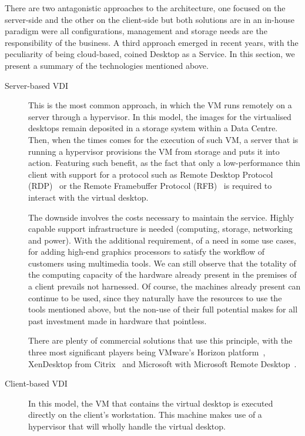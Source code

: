 There are two antagonistic approaches to the architecture, one focused on the server-side and the other on the client-side but both solutions are in an in-house paradigm were all configurations, management and storage needs are the responsibility of the business. A third approach emerged in recent years, with the peculiarity of being cloud-based, coined Desktop as a Service.
In this section, we present a summary of the technologies mentioned above.

\begin{description}
	\item [Server-based VDI] This is the most common approach, in which the VM runs remotely on a server through a hypervisor. In this model, the images for the virtualised desktops remain deposited in a storage system within a Data Centre. Then, when the times comes for the execution of such VM, a server that is running a hypervisor provisions the VM from storage and puts it into action. Featuring such benefit, as the fact that only a low-performance thin client with support for a protocol such as Remote Desktop Protocol (RDP)~\cite{Microsoft_RDP} or the Remote Framebuffer Protocol (RFB)~\cite{rfc6143} is required to interact with the virtual desktop.

        The downside involves the costs necessary to maintain the service. Highly capable support infrastructure is needed (computing, storage, networking and power). With the additional requirement, of a need in some use cases, for adding high-end graphics processors to satisfy the workflow of customers using multimedia tools. We can still observe that the totality of the computing capacity of the hardware already present in the premises of a client prevails not harnessed. Of course, the machines already present can continue to be used, since they naturally have the resources to use the tools mentioned above, but the non-use of their full potential makes for all past investment made in hardware that pointless.

        There are plenty of commercial solutions that use this principle, with the three most significant players being VMware's Horizon platform~\cite{VMware_horizon}, XenDesktop from Citrix~\cite{Citrix_XenDesktop} and Microsoft with Microsoft Remote Desktop~\cite{Microsoft_RDS}.
	\item [Client-based VDI] In this model, the VM that contains the virtual desktop is executed directly on the client's workstation. This machine makes use of a hypervisor that will wholly handle the virtual desktop.


\end{description}
